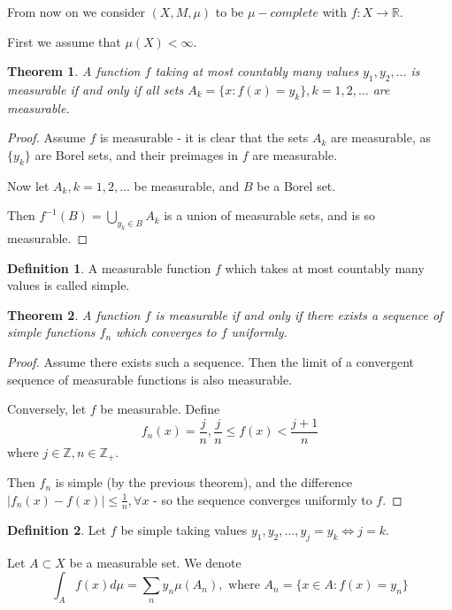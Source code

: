 \documentclass[11pt,a4paper]{report}
\theoremstyle{plain}
\newtheorem{thm}{Theorem}[section]
\theoremstyle{definition}
\newtheorem*{defn}{Definition}
\theoremstyle{remark}
\newcommand{\Union}{\bigcup}
\newcommand{\R}{\mathbb{R}}
\newcommand{\Z}{\mathbb{Z}}
\newcommand{\abs}[1]{\left| #1 \right|}
\begin{document}
From now on we consider $(X, M, \mu)$ to be $\mu-complete$ with $f : X \rightarrow \R$. 

First we assume that $\mu(X) < \infty$.

\begin{thm}
    A function $f$ taking at most countably many values $y_1, y_2, \dots$ is measurable if and only if all sets $A_k = \{ x : f(x) = y_k \}, k = 1, 2, \dots$ are measurable.
\end{thm}

\begin{proof}
    Assume $f$ is measurable - it is clear that the sets $A_k$ are measurable, as $\{y_k\}$ are Borel sets, and their preimages in $f$ are measurable.

    Now let $A_k, k = 1, 2, \dots$ be measurable, and $B$ be a Borel set.

    Then $f^{-1}(B) = \Union_{y_k \in B} A_k$ is a union of measurable sets, and is so measurable.
\end{proof}

\begin{defn}
    A measurable function $f$ which takes at most countably many values is called simple.
\end{defn}

\begin{thm}
    A function $f$ is measurable if and only if there exists a sequence of simple functions $f_n$ which converges to $f$ uniformly.
\end{thm}

\begin{proof}
    Assume there exists such a sequence. Then the limit of a convergent sequence of measurable functions is also measurable.

    Conversely, let $f$ be measurable.
    Define
    $$ f_n(x) = \frac{j}{n}, \frac{j}{n} \le f(x) < \frac{j+1}{n}$$ 
    where $j \in \Z, n \in \Z_{+}$.

    Then $f_n$ is simple (by the previous theorem), and the difference $\abs{f_n(x) - f(x)} \le \frac{1}{n}, \forall x$ - so the sequence converges uniformly to $f$.
\end{proof}

\begin{defn}
    Let $f$ be simple taking values $y_1, y_2, \dots, y_j = y_k \iff j = k$.

    Let $A \subset X$ be a measurable set. We denote
    $$ \int_A f(x) d\mu = \sum_n y_n\mu(A_n), \text{ where } A_n = \{ x \in A : f(x) = y_n \} $$
\end{defn}
\end{document}
